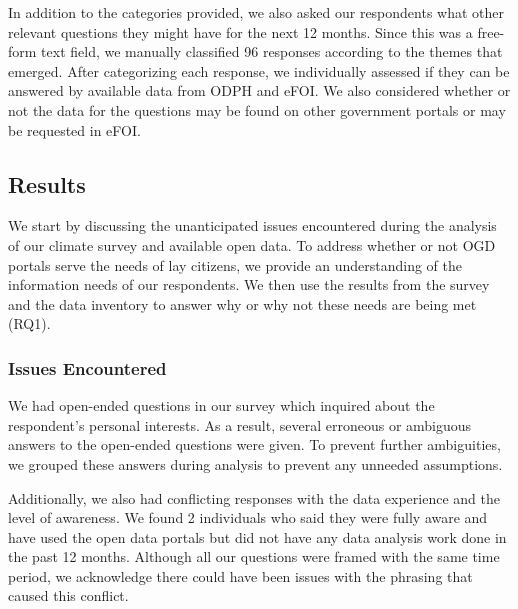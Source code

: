 \documentclass{sigchi}
\begin{document}
In addition to the categories provided, we also asked our respondents what other relevant questions they might have for the next 12 months. Since this was a free-form text field, we manually classified 96 responses according to the themes that emerged. After categorizing each response, we individually assessed if they can be answered by available data from ODPH and eFOI. We also considered whether or not the data for the questions may be found on other government portals or may be requested in eFOI.

\subsection{Results}
We start by discussing the unanticipated issues encountered during the analysis of our climate survey and available open data. To address whether or not OGD portals serve the needs of lay citizens, we provide an understanding of the information needs of our respondents. We then use the results from the survey and the data inventory to answer why or why not these needs are being met (RQ1).

\subsubsection{Issues Encountered}

We had open-ended questions in our survey which inquired about the respondent's personal interests. As a result, several erroneous or ambiguous answers to the open-ended questions were given. To prevent further ambiguities, we grouped these answers during analysis to prevent any unneeded assumptions.

Additionally, we also had conflicting responses with the data experience and the level of awareness. We found 2 individuals who said they were fully aware and have used the open data portals but did not have any data analysis work done in the past 12 months. Although all our questions were framed with the same time period, we acknowledge there could have been issues with the phrasing that caused this conflict.
\end{document}
